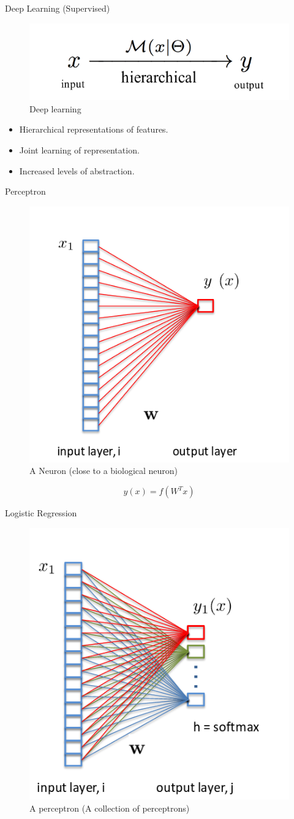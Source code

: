 ﻿\documentclass[table,aspectratio=43,mathserif,xcolor={usenames,dvipsnames,svgnames,table},10pt]{beamer}
\begin{document}
\begin{frame}{Deep Learning (Supervised)}
 \begin{figure}[h]
    \includegraphics[width=0.9\linewidth]{images/dl.png}  
    \caption{Deep learning}
  \end{figure}
 \begin{itemize}
  \item<+-> Hierarchical representations of features.
  \item<+-> Joint learning of representation.
  \item<+-> Increased levels of abstraction.
 \end{itemize}
\end{frame}

\begin{frame}{Perceptron}
 \begin{figure}[h]
    \includegraphics[width=0.5\linewidth]{images/perceptron.png}  
    \caption{A Neuron (close to a biological neuron)}
  \end{figure}
  $$ y(x) = f( W^T x )$$
\end{frame}

\begin{frame}{Logistic Regression}
 \begin{figure}[h]
    \includegraphics[width=0.5\linewidth]{images/lr.png}  
    \caption{A perceptron (A collection of perceptrons)}
  \end{figure}
\end{frame}
\end{document}
